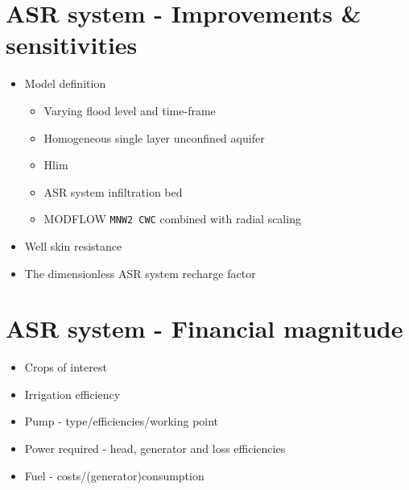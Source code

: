 \section{ASR system - Improvements \& sensitivities} 
\begin{itemize}
\item{Model definition} 
\begin{itemize}
\item{Varying flood level and time-frame}
\item{Homogeneous single layer unconfined aquifer}
\item{Hlim}
\item{ASR system infiltration bed}
\item{MODFLOW \texttt{MNW2 CWC} combined with radial scaling}
\end{itemize}
\item{Well skin resistance}
\item{The dimensionless ASR system recharge factor}
\end{itemize}

\section{ASR system - Financial magnitude} 
\begin{itemize}
\item{Crops of interest}
\item{Irrigation efficiency}
\item{Pump - type/efficiencies/working point}
\item{Power required - head, generator and loss efficiencies}
\item{Fuel - costs/(generator)consumption}
\end{itemize}


